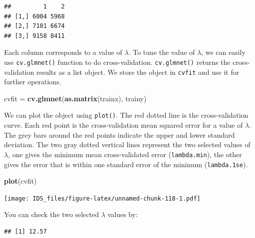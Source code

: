 \documentclass[12pt,]{krantz}
\makeatletter
\newenvironment{Shaded}{\begin{snugshade}}{\end{snugshade}}
\newcommand{\CommentTok}[1]{\textcolor[rgb]{0.37,0.37,0.37}{\textit{#1}}}
\newcommand{\FloatTok}[1]{\textcolor[rgb]{0.06,0.06,0.06}{#1}}
\newcommand{\KeywordTok}[1]{\textcolor[rgb]{0.27,0.27,0.27}{\textbf{#1}}}
\newcommand{\NormalTok}[1]{#1}
\newcommand{\OperatorTok}[1]{\textcolor[rgb]{0.43,0.43,0.43}{\textbf{#1}}}
\newcommand{\StringTok}[1]{\textcolor[rgb]{0.5,0.5,0.5}{#1}}
\newenvironment{kframe}{%
\medskip{}
\setlength{\fboxsep}{.8em}
 \def\at@end@of@kframe{}%
 \ifinner\ifhmode%
  \def\at@end@of@kframe{\end{minipage}}%
  \begin{minipage}{\columnwidth}%
 \fi\fi%
 \def\FrameCommand##1{\hskip\@totalleftmargin \hskip-\fboxsep
 \colorbox{shadecolor}{##1}\hskip-\fboxsep
     \hskip-\linewidth \hskip-\@totalleftmargin \hskip\columnwidth}%
 \MakeFramed {\advance\hsize-\width
   \@totalleftmargin\z@ \linewidth\hsize
   \@setminipage}}%
 {\par\unskip\endMakeFramed%
 \at@end@of@kframe}
\renewenvironment{Shaded}{\begin{kframe}}{\end{kframe}}
\makeatother
\begin{document}
\begin{verbatim}
##         1    2
## [1,] 6004 5968
## [2,] 7101 6674
## [3,] 9158 8411
\end{verbatim}

Each column corresponds to a value of \(\lambda\). To tune the value of \(\lambda\), we can easily use \texttt{cv.glmnet()} function to do cross-validation. \texttt{cv.glmnet()} returns the cross-validation results as a list object. We store the object in \texttt{cvfit} and use it for further operations.

\begin{Shaded}
\begin{Highlighting}[]
\NormalTok{cvfit =}\StringTok{ }\KeywordTok{cv.glmnet}\NormalTok{(}\KeywordTok{as.matrix}\NormalTok{(trainx), trainy)}
\end{Highlighting}
\end{Shaded}

We can plot the object using \texttt{plot()}. The red dotted line is the cross-validation curve. Each red point is the cross-validation mean squared error for a value of \(\lambda\). The grey bars around the red points indicate the upper and lower standard deviation. The two gray dotted vertical lines represent the two selected values of \(\lambda\), one gives the minimum mean cross-validated error (\texttt{lambda.min}), the other gives the error that is within one standard error of the minimum (\texttt{lambda.1se}).

\begin{Shaded}
\begin{Highlighting}[]
\KeywordTok{plot}\NormalTok{(cvfit)}
\end{Highlighting}
\end{Shaded}

\texttt{[image: IDS\_files/figure-latex/unnamed-chunk-118-1.pdf]}

You can check the two selected \(\lambda\) values by:

\begin{Shaded}
\end{Shaded}

\begin{verbatim}
## [1] 12.57
\end{verbatim}

\begin{Shaded}
\end{Shaded}
\end{document}

